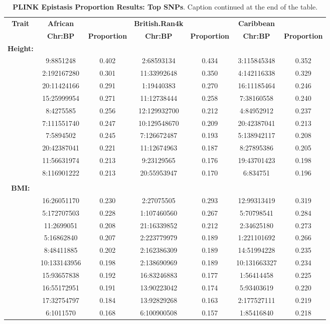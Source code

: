 \documentclass[12pt, a4paper]{article}
\begin{document}

\begin{landscape}
\setlength{\footskip}{2cm}
\begin{table}[ht]
\centering
\begin{tabular}{ccccccc}
  \hline
  \textbf{Trait} & \textbf{African} & & \textbf{British.Ran4k} & & \textbf{Caribbean} & \\ 
& \textbf{Chr:BP} & \textbf{Proportion} & \textbf{Chr:BP} & \textbf{Proportion} & \textbf{Chr:BP} & \textbf{Proportion} \\ 
  \hline
\textbf{Height:} & & & & & & \\
& 9:8851248 & 0.402 & 2:68593134 & 0.434 & 3:115845348 & 0.352 \\
  & 2:192167280 & 0.301 & 11:33992648 & 0.350 & 4:142116338 & 0.329 \\ 
  & 20:11424166 & 0.291 & 1:19440383 & 0.270 & 16:11185464 & 0.246 \\ 
  & 15:25999954 & 0.271 & 11:12738444 & 0.258 & 7:38160558 & 0.240 \\ 
  & 8:4275585 & 0.256 & 12:129932700 & 0.212 & 4:84952912 & 0.237 \\ 
  & 7:111551740 & 0.247 & 10:129548670 & 0.209 & 20:42387041 & 0.213 \\ 
  & 7:5894502 & 0.245 & 7:126672487 & 0.193 & 5:138942117 & 0.208 \\ 
  & 20:42387041 & 0.221 & 11:12674963 & 0.187 & 8:27895386 & 0.205 \\ 
  & 11:56631974 & 0.213 & 9:23129565 & 0.176 & 19:43701423 & 0.198 \\ 
  & 8:116901222 & 0.213 & 20:55953947 & 0.170 & 6:834751 & 0.196 \\ 
  \\
\textbf{BMI:} & & & & & & \\
& 16:26051170 & 0.230 & 2:27075505 & 0.293 & 12:99313419 & 0.319 \\ 
  & 5:172707503 & 0.228 & 1:107460560 & 0.267 & 5:70798541 & 0.284 \\ 
  & 11:2699051 & 0.208 & 21:16339852 & 0.212 & 2:34625180 & 0.273 \\ 
  & 5:16862840 & 0.207 & 2:223779979 & 0.189 & 1:221101692 & 0.266 \\ 
  & 8:48411885 & 0.202 & 2:162386309 & 0.189 & 14:51994228 & 0.235 \\ 
  & 10:133143956 & 0.198 & 2:138690969 & 0.189 & 10:131663327 & 0.234 \\ 
  & 15:93657838 & 0.192 & 16:83246883 & 0.177 & 1:56414458 & 0.225 \\ 
  & 16:55172951 & 0.191 & 13:90223042 & 0.174 & 5:93403619 & 0.220 \\ 
  & 17:32754797 & 0.184 & 13:92829268 & 0.163 & 2:177527111 & 0.219 \\ 
  & 6:1011570 & 0.168 & 6:100900508 & 0.157 & 1:85416840 & 0.218 \\
   \hline
\end{tabular}
\caption[TBD]{\textbf{PLINK Epistasis Proportion Results: Top SNPs}. Caption continued at the end of the table.}
\label{InterPath-Supp-Table-PLINK-Proportions-TopSNPs-a}
\end{table}
\end{landscape}
\end{document}
